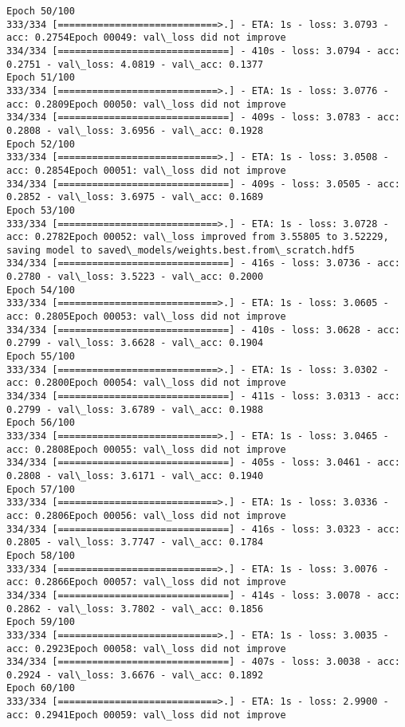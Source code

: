 \documentclass[11pt]{article}
\begin{document}
\begin{Verbatim}[commandchars=\\\{\}]
Epoch 50/100
333/334 [============================>.] - ETA: 1s - loss: 3.0793 - acc: 0.2754Epoch 00049: val\_loss did not improve
334/334 [==============================] - 410s - loss: 3.0794 - acc: 0.2751 - val\_loss: 4.0819 - val\_acc: 0.1377
Epoch 51/100
333/334 [============================>.] - ETA: 1s - loss: 3.0776 - acc: 0.2809Epoch 00050: val\_loss did not improve
334/334 [==============================] - 409s - loss: 3.0783 - acc: 0.2808 - val\_loss: 3.6956 - val\_acc: 0.1928
Epoch 52/100
333/334 [============================>.] - ETA: 1s - loss: 3.0508 - acc: 0.2854Epoch 00051: val\_loss did not improve
334/334 [==============================] - 409s - loss: 3.0505 - acc: 0.2852 - val\_loss: 3.6975 - val\_acc: 0.1689
Epoch 53/100
333/334 [============================>.] - ETA: 1s - loss: 3.0728 - acc: 0.2782Epoch 00052: val\_loss improved from 3.55805 to 3.52229, saving model to saved\_models/weights.best.from\_scratch.hdf5
334/334 [==============================] - 416s - loss: 3.0736 - acc: 0.2780 - val\_loss: 3.5223 - val\_acc: 0.2000
Epoch 54/100
333/334 [============================>.] - ETA: 1s - loss: 3.0605 - acc: 0.2805Epoch 00053: val\_loss did not improve
334/334 [==============================] - 410s - loss: 3.0628 - acc: 0.2799 - val\_loss: 3.6628 - val\_acc: 0.1904
Epoch 55/100
333/334 [============================>.] - ETA: 1s - loss: 3.0302 - acc: 0.2800Epoch 00054: val\_loss did not improve
334/334 [==============================] - 411s - loss: 3.0313 - acc: 0.2799 - val\_loss: 3.6789 - val\_acc: 0.1988
Epoch 56/100
333/334 [============================>.] - ETA: 1s - loss: 3.0465 - acc: 0.2808Epoch 00055: val\_loss did not improve
334/334 [==============================] - 405s - loss: 3.0461 - acc: 0.2808 - val\_loss: 3.6171 - val\_acc: 0.1940
Epoch 57/100
333/334 [============================>.] - ETA: 1s - loss: 3.0336 - acc: 0.2806Epoch 00056: val\_loss did not improve
334/334 [==============================] - 416s - loss: 3.0323 - acc: 0.2805 - val\_loss: 3.7747 - val\_acc: 0.1784
Epoch 58/100
333/334 [============================>.] - ETA: 1s - loss: 3.0076 - acc: 0.2866Epoch 00057: val\_loss did not improve
334/334 [==============================] - 414s - loss: 3.0078 - acc: 0.2862 - val\_loss: 3.7802 - val\_acc: 0.1856
Epoch 59/100
333/334 [============================>.] - ETA: 1s - loss: 3.0035 - acc: 0.2923Epoch 00058: val\_loss did not improve
334/334 [==============================] - 407s - loss: 3.0038 - acc: 0.2924 - val\_loss: 3.6676 - val\_acc: 0.1892
Epoch 60/100
333/334 [============================>.] - ETA: 1s - loss: 2.9900 - acc: 0.2941Epoch 00059: val\_loss did not improve

\end{Verbatim}
\end{document}
